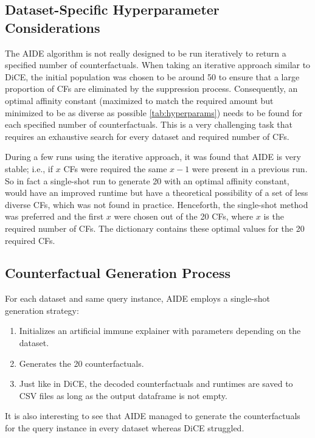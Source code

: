 \subsection{Dataset-Specific Hyperparameter Considerations}
The AIDE algorithm is not really designed to be run iteratively to return a specified number of counterfactuals. When taking an iterative approach similar to DiCE, the initial population was chosen to be around 50 to ensure that a large proportion of CFs are eliminated by the suppression process. Consequently, an optimal affinity constant (maximized to match the required amount but minimized to be as diverse as possible \ref{tab:hyperparams}) needs to be found for each specified number of counterfactuals. This is a very challenging task that requires an exhaustive search for every dataset and required number of CFs. 

During a few runs using the iterative approach, it was found that AIDE is very stable; i.e., if $x$ CFs were required the same $x-1$ were present in a previous run. So in fact a single-shot run to generate 20 with an optimal affinity constant, would have an improved runtime but have a theoretical possibility of a set of less diverse CFs, which was not found in practice. Henceforth, the single-shot method was preferred and the first $x$ were chosen out of the 20 CFs, where $x$ is the required number of CFs. The  dictionary contains these optimal values for the 20 required CFs.

\subsection{Counterfactual Generation Process}  
For each dataset and same query instance, AIDE employs a single-shot generation strategy:  
\begin{enumerate}  
    \item Initializes an artificial immune explainer with parameters depending on the dataset.  
    \item Generates the 20 counterfactuals.
    \item Just like in DiCE, the decoded counterfactuals and runtimes are saved to CSV files as long as the output dataframe is not empty.
\end{enumerate}

It is also interesting to see that AIDE managed to generate the counterfactuals for the query instance in every dataset whereas DiCE struggled.

